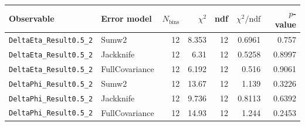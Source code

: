 \begin{tabular}{|l|l|r|r|r|r|r|}
\hline
Observable & Error model & $N_{\mathrm{bins}}$ & $\chi^2$ & ndf & $\chi^2/\mathrm{ndf}$ & $p$-value \\
\hline
\texttt{DeltaEta\_Result0.5\_2} & Sumw2 & 12 & 8.353 & 12 & 0.6961 & 0.757 \\
\texttt{DeltaEta\_Result0.5\_2} & Jackknife & 12 & 6.31 & 12 & 0.5258 & 0.8997 \\
\texttt{DeltaEta\_Result0.5\_2} & FullCovariance & 12 & 6.192 & 12 & 0.516 & 0.9061 \\
\texttt{DeltaPhi\_Result0.5\_2} & Sumw2 & 12 & 13.67 & 12 & 1.139 & 0.3226 \\
\texttt{DeltaPhi\_Result0.5\_2} & Jackknife & 12 & 9.736 & 12 & 0.8113 & 0.6392 \\
\texttt{DeltaPhi\_Result0.5\_2} & FullCovariance & 12 & 14.93 & 12 & 1.244 & 0.2453 \\
\hline
\end{tabular}
